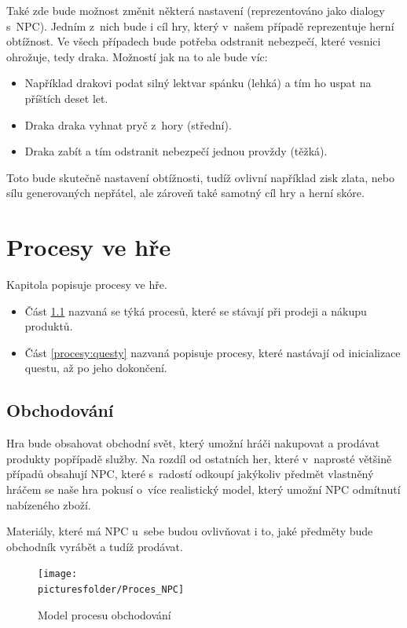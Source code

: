 \documentclass[12pt,a4paper]{article}
\def\picturesfolder{obrazky}
\begin{document}
Také zde bude možnost změnit některá nastavení (reprezentováno jako dialogy
s~NPC). Jedním z~nich bude i cíl hry, který v~našem případě reprezentuje
herní obtížnost. Ve všech případech bude potřeba odstranit nebezpečí,
které vesnici ohrožuje, tedy draka.  Možností jak na to ale bude víc:

\begin{itemize}
\item Například drakovi podat silný lektvar spánku (lehká) a tím ho uspat na
příštích deset let.
\item Draka draka vyhnat pryč z~hory (střední).
\item Draka zabít a tím odstranit nebezpečí jednou provždy (těžká).
\end{itemize}

Toto bude skutečně nastavení obtížnosti, tudíž ovlivní například zisk zlata,
nebo sílu generovaných nepřátel, ale zároveň také samotný cíl hry
a herní skóre.

\newpage
\section{Procesy ve hře}
Kapitola popisuje procesy ve hře.
\begin{itemize}
  \item{Část \ref{procesy:obchod} nazvaná  se týká procesů,
    které se stávají při prodeji a nákupu produktů.}
  \item{Část \ref{procesy:questy} nazvaná  popisuje procesy, které
    nastávají od inicializace questu, až po jeho dokončení.}
\end{itemize}

\subsection{Obchodování} \label{procesy:obchod}
Hra bude obsahovat obchodní svět, který umožní hráči nakupovat a prodávat
produkty popřípadě služby. Na rozdíl od ostatních her, které v~naprosté většině
případů obsahují NPC, které s~radostí odkoupí jakýkoliv předmět vlastněný hráčem
se naše hra pokusí o~více realistický model, který umožní NPC odmítnutí
nabízeného zboží.

Materiály, které má NPC u~sebe budou ovlivňovat i to, jaké předměty bude
obchodník vyrábět a tudíž prodávat.

\begin{figure}
\begin{center}
\texttt{[image: \\picturesfolder/Proces\_NPC]}
  \caption{Model procesu obchodování}
  \label{process:trade}
\end{center}
\end{figure}
\end{document}

